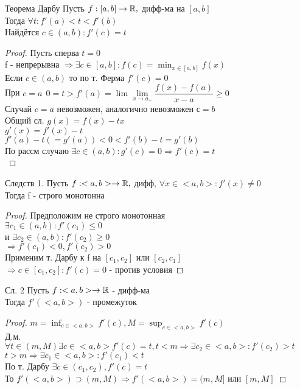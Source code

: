 \begin{theorem}
	Теорема Дарбу
	Пусть $ f : [a,b] \rightarrow \mathbb{R}, $ дифф-ма на $ [a, b] $ \\
	Тогда $ \forall t: f'(a) < t < f'(b) $ \\
	Найдётся $ c \in (a, b) : f'(c) = t $ \\
	\begin{proof}
		Пусть сперва $ t = 0 $ \\
		f - непрерывна $ \Rightarrow \exists c \in [a,b] : f(c) = \min_{x \in [a,b]} f(x)  $ \\
		Если $ c \in (a,b) $ то по т. Ферма $f'(c) = 0$\\
		При $ c = a \ \ 0 = t > f'(a) = \lim\lim\limits_{x \rightarrow a_+} \dfrac{f(x) - f(a)}{x - a} \geq 0  $ \\
		Случай $ c = a $ невозможен, аналогично невозможен $с = b$ \\
		Общий сл. $ g(x) = f(x) - tx $ \\
		$ g'(x) = f'(x) - t $ \\
		$ f'(a) - t (= g'(a)) < 0 < f'(b) - t = g'(b) $ \\
		По рассм случаю $ \exists c \in (a, b) : g'(c) = 0 \Rightarrow f'(c) = t $ \\		
	\end{proof}
\end{theorem}
Следств 1.  Пусть $ f : <a,b> \rightarrow \mathbb{R},$ дифф, $ \forall x \in <a,b> : f'(x) \neq 0 $ \\
Тогда f - строго монотонна 
\begin{proof}
	Предположим не строго монотонная \\
	$ \exists c_1 \in (a, b) : f'(c_1) \leq 0 $ \\
	и $ \exists c_2 \in (a, b) : f'(c_2) \geq 0 $ \\
	$ \Rightarrow f'(c_1) < 0, f'(c_2) > 0 $ \\
	Применим т. Дарбу к f на $ [c_1, c_2] $ или $ [c_2, c_1] $ \\
	$ \Rightarrow c \in [c_1, c_2] : f'(c) = 0 $ - против условия
\end{proof} 

Сл. 2 Пусть $ f : <a,b> \rightarrow \mathbb{R} $ - дифф-ма \\
Тогда $ f'(<a,b>) $ - промежуток \\

\begin{proof}
	$ m = \inf_{c \in <a,b>} f'(c) , M = \sup_{c \in <a,b>} f'(c) $ \\
	Д.м. $ \forall t \in (m, M) \exists c \in <a,b>  f'(c) = t,  t < m  \Rightarrow \exists c_2 \in <a,b>  : f'(c_2) > t $ \\
	$ t > m \Rightarrow \exists c_1 \in <a,b> : f'(c_1) < t $ \\
	По т. Дарбу $ \exists c \in (c_1, c_2), f'(c) = t $ \\
	То $ f'(<a,b>) \supset (m, M) \Rightarrow f'(<a,b>) = (m, M] $ или $ [m, M] $ 
\end{proof}

